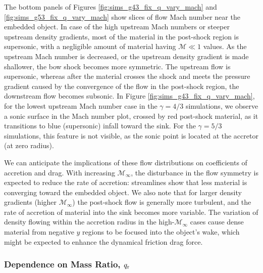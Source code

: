 The bottom panels of Figures \ref{fig:sims_g43_fix_q_vary_mach} and \ref{fig:sims_g53_fix_q_vary_mach} show slices of flow Mach number near the embedded object. In case of the high upstream Mach numbers or steeper upstream density gradients, most of the material in the post-shock region is supersonic, with a negligible amount of material having $\mathcal{M} \ll 1$ values. As the upstream Mach number is decreased, or the upstream density gradient is made shallower, the bow shock becomes more symmetric. The upstream flow is supersonic, whereas after the material crosses the shock and meets the pressure gradient caused by the convergence of the flow in the post-shock region, the downstream flow becomes subsonic. %
In Figure \ref{fig:sims_g43_fix_q_vary_mach}, for the lowest upstream Mach number case in the $\gamma = 4/3$ simulations, we observe a sonic surface in the Mach number plot, crossed by red post-shock material, as it transitions to blue (supersonic) infall toward the sink. For the $\gamma=5/3$ simulations, this feature is not visible, as the sonic point is located at the accretor (at zero radius).


We can anticipate the implications of these flow distributions on coefficients of accretion and drag. With increasing $\mathcal{M}_\infty$, the disturbance in the flow symmetry is expected to reduce the rate of accretion: streamlines show that less material is converging toward the embedded object.  We also note that for larger density gradients (higher $\mathcal{M}_\infty$) the post-shock flow is generally more turbulent, and the rate of accretion of material into the sink becomes more variable. The variation of density flowing within the accretion radius in the high-$\mathcal{M}_\infty$ cases cause dense material from negative $y$ regions to be focused into the object's wake, which might be expected to enhance the dynamical friction drag force.

\subsubsection{Dependence on Mass Ratio, $q_{\rm r}$}\label{sec:hydro_q}

